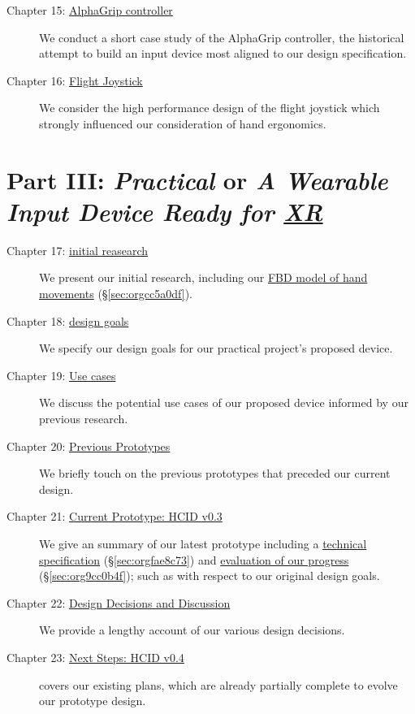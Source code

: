 \documentclass[logo,bsc,singlespacing,parskip]{infthesis}
\begin{document}
\begin{description}
\item[{Chapter 15: \hyperref[sec:org23a7c76]{AlphaGrip controller}}] We  conduct a short case study of the AlphaGrip controller, the historical attempt to build  an input device most aligned to our design specification.

\item[{Chapter 16: \hyperref[sec:orga22be8e]{Flight Joystick}}] We consider the high performance design of the flight joystick which strongly influenced our consideration of hand ergonomics.
\end{description}

\section*{Part III: \emph{Practical} or \emph{A Wearable Input Device Ready for \hyperref[orgf7f8e78]{XR}}}
\label{sec:org465bdce}
\begin{description}
\item[{Chapter 17: \hyperref[sec:org3361615]{initial reasearch}}] We present our initial research, including our \hyperref[sec:orgcc5a0df]{FBD model of hand movements} (\S \ref{sec:orgcc5a0df}).

\item[{Chapter 18: \hyperref[sec:org09dec1d]{design goals}}] We specify our design goals for our practical project's proposed device.

\item[{Chapter 19:  \hyperref[sec:orgb9b4f20]{Use cases}}] We discuss the potential use cases of our proposed  device  informed by our previous research.

\item[{Chapter 20: \hyperref[sec:org23c1072]{Previous Prototypes}}] We briefly touch on the previous prototypes that preceded our current design.

\item[{Chapter 21: \hyperref[sec:org208909f]{Current Prototype: HCID v0.3}}] We give an summary of our latest prototype including a \hyperref[sec:orgfae8c73]{technical specification} (\S \ref{sec:orgfae8c73}) and \hyperref[sec:org9cc0b4f]{evaluation of our progress} (\S \ref{sec:org9cc0b4f}); such as with respect to our original design goals.

\item[{Chapter 22: \hyperref[sec:org87a20d9]{Design Decisions and Discussion}}] We provide a lengthy account of our various design decisions.

\item[{Chapter 23:  \hyperref[sec:orgeda2f4c]{Next Steps: HCID v0.4}}] covers our existing plans, which are already partially complete to evolve our prototype design.
\end{description}
\end{document}
